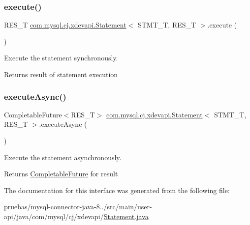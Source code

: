 \mbox{\label{interfacecom_1_1mysql_1_1cj_1_1xdevapi_1_1_statement_ae92dce50b119561fd532303ad491c610}} 
\subsubsection{\texorpdfstring{execute()}{execute()}}
{\footnotesize\ttfamily R\+E\+S\+\_\+T \mbox{\hyperlink{interfacecom_1_1mysql_1_1cj_1_1xdevapi_1_1_statement}{com.\+mysql.\+cj.\+xdevapi.\+Statement}}$<$ S\+T\+M\+T\+\_\+T, R\+E\+S\+\_\+T $>$.execute (\begin{DoxyParamCaption}{ }\end{DoxyParamCaption})}

Execute the statement synchronously.

\begin{DoxyReturn}{Returns}
result of statement execution 
\end{DoxyReturn}
\mbox{\label{interfacecom_1_1mysql_1_1cj_1_1xdevapi_1_1_statement_abb6aa6d3f4b3088af1a2f81a50eeab49}} 
\subsubsection{\texorpdfstring{execute\+Async()}{executeAsync()}}
{\footnotesize\ttfamily Completable\+Future$<$R\+E\+S\+\_\+T$>$ \mbox{\hyperlink{interfacecom_1_1mysql_1_1cj_1_1xdevapi_1_1_statement}{com.\+mysql.\+cj.\+xdevapi.\+Statement}}$<$ S\+T\+M\+T\+\_\+T, R\+E\+S\+\_\+T $>$.execute\+Async (\begin{DoxyParamCaption}{ }\end{DoxyParamCaption})}

Execute the statement asynchronously.

\begin{DoxyReturn}{Returns}
\mbox{\hyperlink{}{Completable\+Future}} for result 
\end{DoxyReturn}


The documentation for this interface was generated from the following file\+:\begin{DoxyCompactItemize}
\item 
pruebas/mysql-\/connector-\/java-\/8../src/main/user-\/api/java/com/mysql/cj/xdevapi/\mbox{\hyperlink{_statement_8java}{Statement.\+java}}\end{DoxyCompactItemize}

